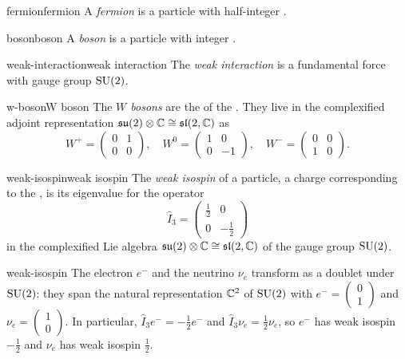 \begin{topic}{fermion}{fermion}
    A \emph{fermion} is a particle with half-integer .
\end{topic}

\begin{topic}{boson}{boson}
    A \emph{boson} is a particle with integer .
\end{topic}

\begin{topic}{weak-interaction}{weak interaction}
    The \emph{weak interaction} is a fundamental force with gauge group $\textup{SU}(2)$.
\end{topic}

\begin{topic}{w-boson}{W boson}
    The \emph{$W$ bosons} are the  of the . They live in the complexified adjoint representation $\mathfrak{su}(2) \otimes \mathbb{C} \cong \mathfrak{sl}(2, \mathbb{C})$ as
    \[ W^+ = \begin{pmatrix} 0 & 1 \\ 0 & 0 \end{pmatrix}, \quad W^0 = \begin{pmatrix} 1 & 0 \\ 0 & -1 \end{pmatrix}, \quad W^- = \begin{pmatrix} 0 & 0 \\ 1 & 0 \end{pmatrix} . \]
\end{topic}

\begin{topic}{weak-isospin}{weak isospin}
    The \emph{weak isospin} of a particle, a charge corresponding to the , is its eigenvalue for the operator
    \[ \hat{I}_3 = \begin{pmatrix} \tfrac{1}{2} & 0 \\ 0 & - \tfrac{1}{2} \end{pmatrix} \]
    in the complexified Lie algebra $\mathfrak{su}(2) \otimes \mathbb{C} \cong \mathfrak{sl}(2, \mathbb{C})$ of the gauge group $\textup{SU}(2)$.
\end{topic}

\begin{example}{weak-isospin}
    The electron $e^-$ and the neutrino $\nu_e$ transform as a doublet under $\textup{SU}(2)$: they span the natural representation $\mathbb{C}^2$ of $\textup{SU}(2)$ with $e^- = \left( \begin{smallmatrix} 0 \\ 1 \end{smallmatrix} \right)$ and $\nu_e = \left( \begin{smallmatrix} 1 \\ 0 \end{smallmatrix} \right)$. In particular, $\hat{I}_3 e^- = -\tfrac{1}{2} e^-$ and $\hat{I}_3 \nu_e = \tfrac{1}{2} \nu_e$, so $e^-$ has weak isospin $-\tfrac{1}{2}$ and $\nu_e$ has weak isospin $\tfrac{1}{2}$.
\end{example}

